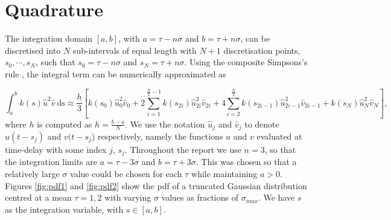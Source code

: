 \section{Quadrature}\label{section:quad}
The integration domain $[a, b]$, with $a=\tau-n\sigma$ and $b=\tau+n\sigma$, can be discretised into $N$ sub-intervals of equal length with $N+1$ discretisation points, $s_0,\cdots,s_{N}$, such that $s_0=\tau-n\sigma$ and $s_N=\tau+n\sigma$. Using the composite Simpsons's rule \cite{compsimp}, the integral term can be numerically approximated as

\begin{equation}\label{simp}\int_{a}^{b}k(s)\hat{u}^2\hat{v}\  \text{ds}\approx\frac{h}{3}\left[k(s_0)\hat{u}^2_0\hat{v}_0+2\sum_{i=1}^{\frac{N}{2}-1}k(s_{2i})\hat{u}^2_{2i}\hat{v}_{2i}+4\sum_{i=2}^{\frac{N}{2}}k(s_{2i-1})\hat{u}^2_{2i-1}\hat{v}_{2i-1}+k(s_N)\hat{u}^2_N\hat{v}_N\right],
\end{equation}
where $h$ is computed as $h=\frac{b-a}{N}$. We use the notation $\hat{u}_j$ and $\hat{v}_j$ to denote $u(t-s_j)$ and $v(t-s_j$) respectively, namely the functions $u$ and $v$ evaluated at time-delay with some index $j$, $s_j$. Throughout the report we use $n=3$, so that the integration limits are $a=\tau-3\sigma$ and $b=\tau+3\sigma$. This was chosen so that a relatively large $\sigma$ value could be chosen for each $\tau$ while maintaining $a>0$.
Figures \ref{fig:pdf1} and \ref{fig:pdf2} show the pdf of a truncated Gaussian distribution centred at a mean $\tau=1,2$ with varying $\sigma$ values as fractions of $\sigma_{max}$. We have $s$ as the integration variable, with $s\in[a,b]$.


